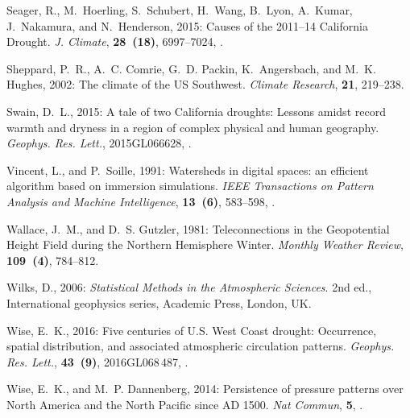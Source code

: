 \documentclass[final, double]{ua-thesis}
\begin{document}
\begin{thebibliography}{}
Seager, R., M.~Hoerling, S.~Schubert, H.~Wang, B.~Lyon, A.~Kumar, J.~Nakamura,
  and N.~Henderson, 2015: Causes of the 2011–14 {California} {Drought}.
  \textit{J. Climate}, \textbf{28~(18)}, 6997--7024,
  .

Sheppard, P.~R., A.~C. Comrie, G.~D. Packin, K.~Angersbach, and M.~K. Hughes,
  2002: The climate of the {US} {Southwest}. \textit{Climate Research},
  \textbf{21}, 219--238.

Swain, D.~L., 2015: A tale of two {California} droughts: {Lessons} amidst
  record warmth and dryness in a region of complex physical and human
  geography. \textit{Geophys. Res. Lett.}, 2015GL066628,
  .

Vincent, L., and P.~Soille, 1991: Watersheds in digital spaces: an efficient
  algorithm based on immersion simulations. \textit{IEEE Transactions on
  Pattern Analysis and Machine Intelligence}, \textbf{13~(6)}, 583--598,
  .

Wallace, J.~M., and D.~S. Gutzler, 1981: Teleconnections in the {Geopotential}
  {Height} {Field} during the {Northern} {Hemisphere} {Winter}. \textit{Monthly
  Weather Review}, \textbf{109~(4)}, 784--812.

Wilks, D., 2006: \textit{Statistical {Methods} in the {Atmospheric}
  {Sciences}}. 2nd ed., International geophysics series, Academic Press,
  London, UK.

Wise, E.~K., 2016: Five centuries of {U}.{S}. {West} {Coast} drought:
  {Occurrence}, spatial distribution, and associated atmospheric circulation
  patterns. \textit{Geophys. Res. Lett.}, \textbf{43~(9)}, 2016GL068\,487,
  .

Wise, E.~K., and M.~P. Dannenberg, 2014: Persistence of pressure patterns over
  {North} {America} and the {North} {Pacific} since {AD} 1500. \textit{Nat
  Commun}, \textbf{5}, .

\end{thebibliography}
\end{document}
